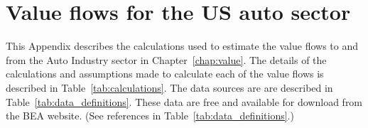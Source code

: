 %
%
%
\chapter{Value flows for the US auto sector}
\label{chap:auto_value_flows} 


This Appendix describes the calculations used 
to estimate the value flows to and from the Auto Industry sector 
in Chapter~\ref{chap:value}.  
The details of the calculations and assumptions made to calculate 
each of the value flows is described in Table~\ref{tab:calculations}. 
The data sources are are described in Table~\ref{tab:data_definitions}. 
These data are free and available for download 
from the BEA website.
(See references in Table~\ref{tab:data_definitions}.)

